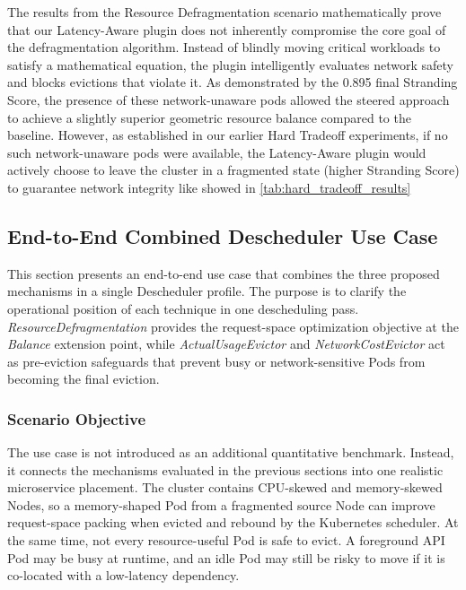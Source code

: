 The results from the Resource Defragmentation scenario mathematically prove that our Latency-Aware plugin does not inherently compromise the core goal of the defragmentation algorithm. Instead of blindly moving critical workloads to satisfy a mathematical equation, the plugin intelligently evaluates network safety and blocks evictions that violate it. As demonstrated by the 0.895 final Stranding Score, the presence of these network-unaware pods allowed the steered approach to achieve a slightly superior geometric resource balance compared to the baseline. However, as established in our earlier Hard Tradeoff experiments, if no such network-unaware pods were available, the Latency-Aware plugin would actively choose to leave the cluster in a fragmented state (higher Stranding Score) to guarantee network integrity like showed in \ref{tab:hard_tradeoff_results}

\subsection{End-to-End Combined Descheduler Use Case}
\label{sec:end_to_end_microservice_usecase}

This section presents an end-to-end use case that combines the three proposed mechanisms in a single Descheduler profile. The purpose is to clarify the operational position of each technique in one descheduling pass. \textit{ResourceDefragmentation} provides the request-space optimization objective at the \textit{Balance} extension point, while \textit{ActualUsageEvictor} and \textit{NetworkCostEvictor} act as pre-eviction safeguards that prevent busy or network-sensitive Pods from becoming the final eviction.

\subsubsection{Scenario Objective}

The use case is not introduced as an additional quantitative benchmark. Instead, it connects the mechanisms evaluated in the previous sections into one realistic microservice placement. The cluster contains CPU-skewed and memory-skewed Nodes, so a memory-shaped Pod from a fragmented source Node can improve request-space packing when evicted and rebound by the Kubernetes scheduler. At the same time, not every resource-useful Pod is safe to evict. A foreground API Pod may be busy at runtime, and an idle Pod may still be risky to move if it is co-located with a low-latency dependency.

